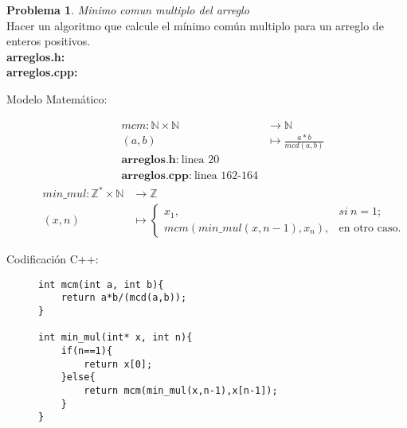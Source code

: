 \documentclass{article}
\theoremstyle{plain}
\theoremstyle{definition}
\newtheorem{problem}{Problema}
\begin{document}
\begin{problem} \emph{Minimo comun multiplo del arreglo}\\
Hacer un algoritmo que calcule el mínimo común multiplo para un arreglo de enteros positivos.\\
\textbf{arreglos.h:}\ \\
\textbf{arreglos.cpp:}\ 
%
\begin{description}
\item[Modelo Matemático:]
%
\begin{align*}
mcm: \mathbb{N}\times\mathbb{N} &\to \mathbb{N}\\
(a,b) &\mapsto \frac{a*b}{mcd(a,b)}\\
\textbf{arreglos.h:}\ \text{linea 20}\\
\textbf{arreglos.cpp:}\ \text{linea 162-164}
\end{align*}
\begin{align*}
min\_mul: \mathbb{Z}^*\times\mathbb{N} &\to \mathbb{Z}\\
(x,n) &\mapsto
\begin{cases}
x_1,& si\ n=1;\\
mcm(min\_mul(x,n-1),x_n),& \text{en otro caso.}
\end{cases}
\end{align*}
%
\item[Codificación \textsf{C++}:]\hfill
%
\begin{verbatim}
int mcm(int a, int b){
    return a*b/(mcd(a,b));
}

int min_mul(int* x, int n){
    if(n==1){
        return x[0];
    }else{
        return mcm(min_mul(x,n-1),x[n-1]);
    }
}

\end{verbatim}
\end{description}
\end{problem}
\end{document}
